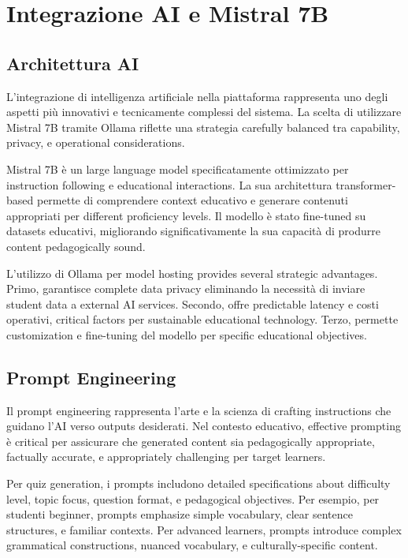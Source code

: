 \documentclass[12pt,a4paper]{article}
\begin{document}
\section{Integrazione AI e Mistral 7B}

\subsection{Architettura AI}

L'integrazione di intelligenza artificiale nella piattaforma rappresenta uno degli aspetti più innovativi e tecnicamente complessi del sistema. La scelta di utilizzare Mistral 7B tramite Ollama riflette una strategia carefully balanced tra capability, privacy, e operational considerations.

Mistral 7B è un large language model specificatamente ottimizzato per instruction following e educational interactions. La sua architettura transformer-based permette di comprendere context educativo e generare contenuti appropriati per different proficiency levels. Il modello è stato fine-tuned su datasets educativi, migliorando significativamente la sua capacità di produrre content pedagogically sound.

L'utilizzo di Ollama per model hosting provides several strategic advantages. Primo, garantisce complete data privacy eliminando la necessità di inviare student data a external AI services. Secondo, offre predictable latency e costi operativi, critical factors per sustainable educational technology. Terzo, permette customization e fine-tuning del modello per specific educational objectives.

\subsection{Prompt Engineering}

Il prompt engineering rappresenta l'arte e la scienza di crafting instructions che guidano l'AI verso outputs desiderati. Nel contesto educativo, effective prompting è critical per assicurare che generated content sia pedagogically appropriate, factually accurate, e appropriately challenging per target learners.

Per quiz generation, i prompts includono detailed specifications about difficulty level, topic focus, question format, e pedagogical objectives. Per esempio, per studenti beginner, prompts emphasize simple vocabulary, clear sentence structures, e familiar contexts. Per advanced learners, prompts introduce complex grammatical constructions, nuanced vocabulary, e culturally-specific content.
\end{document}
